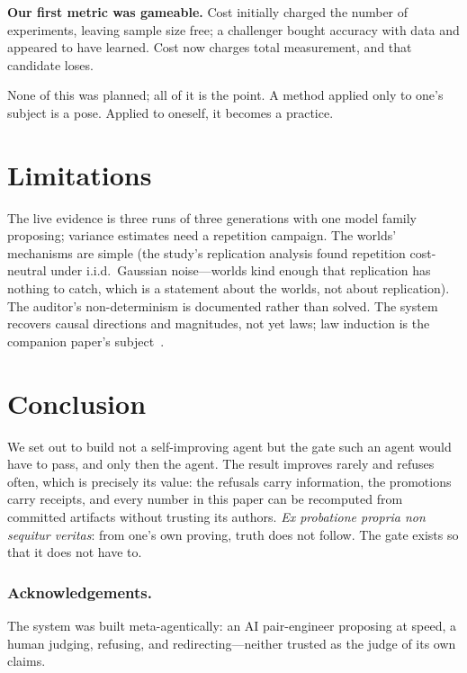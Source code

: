 \documentclass{llncs}
\begin{document}
\textbf{Our first metric was gameable.} Cost initially charged the number of
experiments, leaving sample size free; a challenger bought accuracy with data
and appeared to have learned. Cost now charges total measurement, and that
candidate loses.

None of this was planned; all of it is the point. A method applied only to
one's subject is a pose. Applied to oneself, it becomes a practice.

\section{Limitations}

The live evidence is three runs of three generations with one model family
proposing; variance estimates need a repetition campaign. The worlds'
mechanisms are simple (the study's replication analysis found repetition
cost-neutral under i.i.d.\ Gaussian noise---worlds kind enough that
replication has nothing to catch, which is a statement about the worlds, not
about replication). The auditor's non-determinism is documented rather than
solved. The system recovers causal directions and magnitudes, not yet laws;
law induction is the companion paper's subject~\cite{companion}.

\section{Conclusion}

We set out to build not a self-improving agent but the gate such an agent
would have to pass, and only then the agent. The result improves rarely and
refuses often, which is precisely its value: the refusals carry information,
the promotions carry receipts, and every number in this paper can be
recomputed from committed artifacts without trusting its authors.
\emph{Ex probatione propria non sequitur veritas}: from one's own proving,
truth does not follow. The gate exists so that it does not have to.

\subsubsection*{Acknowledgements.} The system was built meta-agentically: an
AI pair-engineer proposing at speed, a human judging, refusing, and
redirecting---neither trusted as the judge of its own claims.
\end{document}
